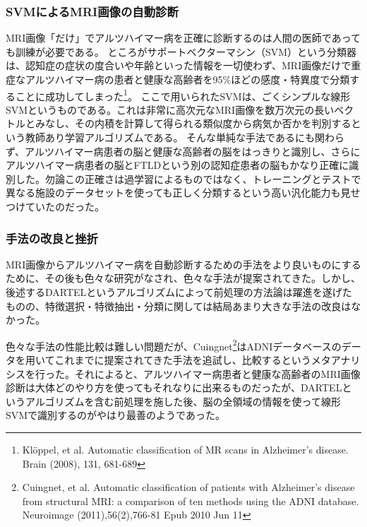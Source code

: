 \subsubsection{SVMによるMRI画像の自動診断}
MRI画像「だけ」でアルツハイマー病を正確に診断するのは人間の医師であっても訓練が必要である。
ところがサポートベクターマシン（SVM）という分類器は、認知症の症状の度合いや年齢といった情報を一切使わず、MRI画像だけで重症なアルツハイマー病の患者と健康な高齢者を95\%ほどの感度・特異度で分類することに成功してしまった\footnote{Kl\"{o}ppel, et al. Automatic classification of MR scans in Alzheimer's disease. Brain (2008), 131, 681-689}。
ここで用いられたSVMは、ごくシンプルな線形SVMというものである。これは非常に高次元なMRI画像を数万次元の長いベクトルとみなし、その内積を計算して得られる類似度から病気か否かを判別するという教師あり学習アルゴリズムである。
そんな単純な手法であるにも関わらず、アルツハイマー病患者の脳と健康な高齢者の脳をはっきりと識別し、さらにアルツハイマー病患者の脳とFTLDという別の認知症患者の脳もかなり正確に識別した。勿論この正確さは過学習によるものではなく、トレーニングとテストで異なる施設のデータセットを使っても正しく分類するという高い汎化能力も見せつけていたのだった。

\subsubsection{手法の改良と挫折}
MRI画像からアルツハイマー病を自動診断するための手法をより良いものにするために、その後も色々な研究がなされ、色々な手法が提案されてきた。しかし、後述するDARTELというアルゴリズムによって前処理の方法論は躍進を遂げたものの、特徴選択・特徴抽出・分類に関しては結局あまり大きな手法の改良はなかった。

色々な手法の性能比較は難しい問題だが、Cuingnet\footnote{Cuingnet, et al. Automatic classification of patients with Alzheimer's disease from structural MRI: a comparison of ten methods using the ADNI database. Neuroimage (2011),56(2),766-81 Epub 2010 Jun 11}はADNIデータベースのデータを用いてこれまでに提案されてきた手法を追試し、比較するというメタアナリシスを行った。それによると、アルツハイマー病患者と健康な高齢者のMRI画像診断は大体どのやり方を使ってもそれなりに出来るものだったが、DARTELというアルゴリズムを含む前処理を施した後、脳の全領域の情報を使って線形SVMで識別するのがやはり最善のようであった。

